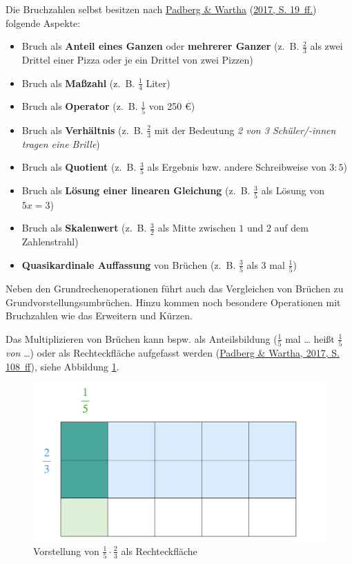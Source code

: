 \documentclass[
  ngerman,
]{scrbook}
\providecommand{\tightlist}{%
  \setlength{\itemsep}{0pt}\setlength{\parskip}{0pt}}
\theoremstyle{definition}
\theoremstyle{definition}
\theoremstyle{definition}
\theoremstyle{definition}
\theoremstyle{remark}
\begin{document}
Die Bruchzahlen selbst besitzen nach \protect\hyperlink{ref-Padberg:2017}{Padberg \& Wartha} (\protect\hyperlink{ref-Padberg:2017}{2017, S. 19~ff.}) folgende Aspekte:

\begin{itemize}
\tightlist
\item
  Bruch als \textbf{Anteil eines Ganzen} oder \textbf{mehrerer Ganzer}
  (z.~B. \(\frac{2}{3}\) als zwei Drittel einer Pizza oder je ein Drittel von zwei Pizzen)
\item
  Bruch als \textbf{Maßzahl}
  (z.~B. \(\frac{1}{4}\) Liter)
\item
  Bruch als \textbf{Operator}
  (z.~B. \(\frac{1}{5}\) von 250 €)
\item
  Bruch als \textbf{Verhältnis}
  (z.~B. \(\frac{2}{3}\) mit der Bedeutung \emph{2 von 3 Schüler/-innen tragen eine Brille})
\item
  Bruch als \textbf{Quotient}
  (z.~B. \(\frac{3}{5}\) als Ergebnis bzw. andere Schreibweise von \(3:5\))
\item
  Bruch als \textbf{Lösung einer linearen Gleichung}
  (z.~B. \(\frac{3}{5}\) als Lösung von \(5x = 3\))\\
\item
  Bruch als \textbf{Skalenwert}
  (z.~B. \(\frac{3}{2}\) als Mitte zwischen \(1\) und \(2\) auf dem Zahlenstrahl)
\item
  \textbf{Quasikardinale Auffassung} von Brüchen
  (z.~B. \(\frac{3}{5}\) als 3 mal \(\frac{1}{5}\))
\end{itemize}

Neben den Grundrechenoperationen führt auch das Vergleichen von Brüchen zu Grundvorstellungsumbrüchen. Hinzu kommen noch besondere Operationen mit Bruchzahlen wie das Erweitern und Kürzen.

Das Multiplizieren von Brüchen kann bspw. als Anteilsbildung (\(\frac{1}{5}\) mal \ldots{} heißt \(\frac{1}{5}\) \emph{von} \ldots) oder als Rechteckfläche aufgefasst werden (\protect\hyperlink{ref-Padberg:2017}{Padberg \& Wartha, 2017, S. 108~ff}), siehe Abbildung \ref{fig:Bruchmultiplikation}.

\begin{figure}

{\centering \includegraphics[width=0.5\linewidth]{pictures/4-Bruchmulti} 

}

\caption{Vorstellung von $\frac{1}{5} \cdot \frac{2}{3}$ als Rechteckfläche}\label{fig:Bruchmultiplikation}
\end{figure}
\end{document}
